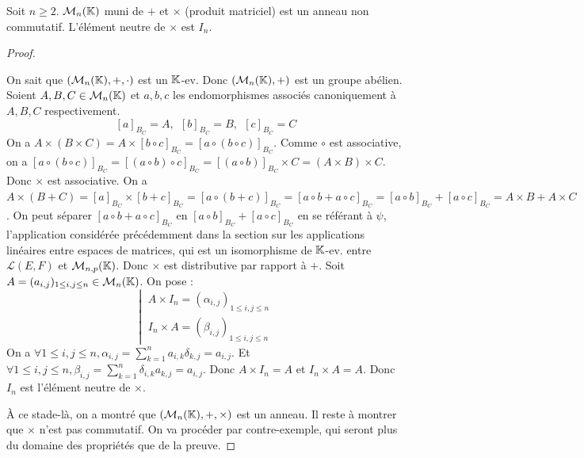 \documentclass[12pt,a4paper]{report}
\begin{document}
\begin{property}
    Soit $n \ge 2$. $\mathcal M_n(\mathbb{K})$ muni de $+$ et $\times$ (produit matriciel) est un anneau non commutatif. L'élément neutre de $\times$ est $I_n$.
\end{property}

\begin{proof}
    \begin{outline}
        \1 On sait que $(\mathcal M_n(\mathbb{K}),+,\cdot)$ est un $\mathbb{K}$-ev. 
        \1 Donc $(\mathcal M_n(\mathbb{K}),+)$ est un groupe abélien.
        \1 Soient $A,B,C \in \mathcal M_n(\mathbb{K})$ et $a,b,c$ les endomorphismes associés canoniquement à $A,B,C$ respectivement.
        $$[a]_{B_C} = A,~~[b]_{B_C} = B,~~[c]_{B_C} = C$$
        \1 On a $A \times (B \times C) = A \times [b\circ c]_{B_C} = [a \circ (b \circ c)]_{B_C}$.
        \1 Comme $\circ$ est associative, on a $[a \circ (b \circ c)]_{B_C} = [(a \circ b) \circ c]_{B_C} = [(a \circ b)]_{B_C} \times C = (A \times B) \times C$.
        \1 Donc $\times$ est associative.
        \1 On a $A\times(B+C) = [a]_{B_C} \times [b+c]_{B_C} = [a \circ (b+c)]_{B_C} = [a\circ b + a \circ c]_{B_C} = [a\circ b]_{B_C} + [a \circ c]_{B_C} = A\times B + A \times C$.
        \2 On peut séparer $[a \circ b + a \circ c]_{B_C}$ en $[a\circ b]_{B_C} + [a \circ c]_{B_C}$ en se référant à $\psi$, l'application considérée précédemment dans la section sur les applications linéaires entre espaces de matrices, qui est un isomorphisme de $\mathbb{K}$-ev. entre $\mathcal L(E,F)$ et $\mathcal M_{n,p}(\mathbb{K})$.
        \1 Donc $\times$ est distributive par rapport à $+$.
        \1 Soit $A = (a_{i,j})_{1 \le i,j \le n} \in \mathcal M_n(\mathbb{K})$. On pose :
        $$\left|~\begin{matrix}
        A\times I_n = (\alpha_{i,j})_{1 \le i,j \le n} \\
        I_n \times A = (\beta_{i,j})_{1 \le i,j \le n}
        \end{matrix}\right.$$
        \1 On a $\forall 1 \le i,j \le n, \alpha_{i,j} = \sum_{k=1}^n a_{i,k} \delta_{k,j} = a_{i,j}$.
        \1 Et $\forall 1 \le i,j \le n, \beta_{i,j} = \sum_{k=1}^n \delta_{i,k} a_{k,j} = a_{i,j}$.
        \1 Donc $A\times I_n = A$ et $I_n \times A = A$.
        \1 Donc $I_n$ est l'élément neutre de $\times$.
    \end{outline}
    À ce stade-là, on a montré que $(\mathcal M_n(\mathbb{K}),+,\times)$ est un anneau. Il reste à montrer que $\times$ n'est pas commutatif. On va procéder par contre-exemple, qui seront plus du domaine des propriétés que de la preuve.
\end{proof}
\end{document}
